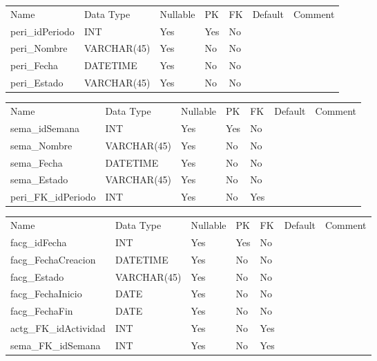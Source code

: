 			\begin{center}
				\begin{tabular}{ |l|l|l|l|l|l|l| }
					\hline
					Name & Data Type & Nullable & PK & FK & Default & Comment \\
					peri_idPeriodo & INT & Yes & Yes & No &  & \\ \hline 
peri_Nombre & VARCHAR(45) & Yes & No & No &  & \\ \hline 
peri_Fecha & DATETIME & Yes & No & No &  & \\ \hline 
peri_Estado & VARCHAR(45) & Yes & No & No &  & \\ \hline 

				\end{tabular}
			\end{center}
		

			\begin{center}
				\begin{tabular}{ |l|l|l|l|l|l|l| }
					\hline
					Name & Data Type & Nullable & PK & FK & Default & Comment \\
					sema_idSemana & INT & Yes & Yes & No &  & \\ \hline 
sema_Nombre & VARCHAR(45) & Yes & No & No &  & \\ \hline 
sema_Fecha & DATETIME & Yes & No & No &  & \\ \hline 
sema_Estado & VARCHAR(45) & Yes & No & No &  & \\ \hline 
peri_FK_idPeriodo & INT & Yes & No & Yes &  & \\ \hline 

				\end{tabular}
			\end{center}
		

			\begin{center}
				\begin{tabular}{ |l|l|l|l|l|l|l| }
					\hline
					Name & Data Type & Nullable & PK & FK & Default & Comment \\
					facg_idFecha & INT & Yes & Yes & No &  & \\ \hline 
facg_FechaCreacion & DATETIME & Yes & No & No &  & \\ \hline 
facg_Estado & VARCHAR(45) & Yes & No & No &  & \\ \hline 
facg_FechaInicio & DATE & Yes & No & No &  & \\ \hline 
facg_FechaFin & DATE & Yes & No & No &  & \\ \hline 
actg_FK_idActividad & INT & Yes & No & Yes &  & \\ \hline 
sema_FK_idSemana & INT & Yes & No & Yes &  & \\ \hline 

				\end{tabular}
			\end{center}
		

